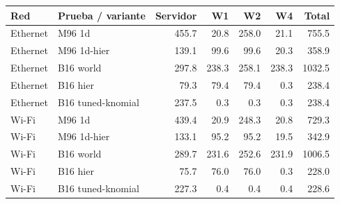 \begin{center}\small
\begin{tabular}{llrrrrr}
\toprule
Red & Prueba / variante & Servidor & W1 & W2 & W4 & Total \\
\midrule
Ethernet & M96 1d & 455.7 & 20.8 & 258.0 & 21.1 & 755.5 \\
Ethernet & M96 1d-hier & 139.1 & 99.6 & 99.6 & 20.3 & 358.9 \\
Ethernet & B16 world & 297.8 & 238.3 & 258.1 & 238.3 & 1032.5 \\
Ethernet & B16 hier & 79.3 & 79.4 & 79.4 & 0.3 & 238.4 \\
Ethernet & B16 tuned-knomial & 237.5 & 0.3 & 0.3 & 0.3 & 238.4 \\
Wi-Fi & M96 1d & 439.4 & 20.9 & 248.3 & 20.8 & 729.3 \\
Wi-Fi & M96 1d-hier & 133.1 & 95.2 & 95.2 & 19.5 & 342.9 \\
Wi-Fi & B16 world & 289.7 & 231.6 & 252.6 & 231.9 & 1006.5 \\
Wi-Fi & B16 hier & 75.7 & 76.0 & 76.0 & 0.3 & 228.0 \\
Wi-Fi & B16 tuned-knomial & 227.3 & 0.4 & 0.4 & 0.4 & 228.6 \\
\bottomrule
\end{tabular}
\end{center}
